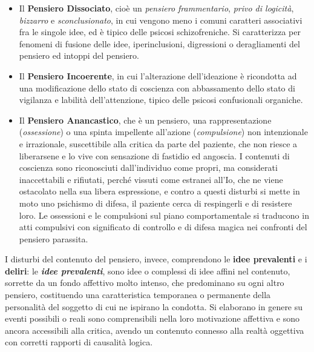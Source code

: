 \documentclass[]{article}
\begin{document}
\begin{itemize}
\item
  Il \textbf{Pensiero Dissociato}, cioè un \emph{pensiero frammentario},
  \emph{privo di logicità}, \emph{bizzarro} e \emph{sconclusionato}, in
  cui vengono meno i comuni caratteri associativi fra le singole idee,
  ed è tipico delle psicosi schizofreniche. Si caratterizza per fenomeni
  di fusione delle idee, iperinclusioni, digressioni o deragliamenti del
  pensiero ed intoppi del pensiero.
\item
  Il \textbf{Pensiero Incoerente}, in cui l'alterazione dell'ideazione è
  ricondotta ad una modificazione dello stato di coscienza con
  abbassamento dello stato di vigilanza e labilità dell'attenzione,
  tipico delle psicosi confusionali organiche.
\item
  Il \textbf{Pensiero Anancastico}, che è un pensiero, una
  rappresentazione (\emph{ossessione}) o una spinta impellente
  all'azione (\emph{compulsione}) non intenzionale e irrazionale,
  suscettibile alla critica da parte del paziente, che non riesce a
  liberarsene e lo vive con sensazione di fastidio ed angoscia. I
  contenuti di coscienza sono riconosciuti dall'individuo come propri,
  ma considerati inaccettabili e rifiutati, perché vissuti come estranei
  all'Io, che ne viene ostacolato nella sua libera espressione, e contro
  a questi disturbi si mette in moto uno psichismo di difesa, il
  paziente cerca di respingerli e di resistere loro. Le ossessioni e le
  compulsioni sul piano comportamentale si traducono in atti compulsivi
  con significato di controllo e di difesa magica nei confronti del
  pensiero parassita.
\end{itemize}

I disturbi del contenuto del pensiero, invece, comprendono le
\textbf{idee prevalenti} e i \textbf{deliri}: le \textbf{\emph{idee
prevalenti}}, sono idee o complessi di idee affini nel contenuto,
sorrette da un fondo affettivo molto intenso, che predominano su ogni
altro pensiero, costituendo una caratteristica temporanea o permanente
della personalità del soggetto di cui ne ispirano la condotta. Si
elaborano in genere su eventi possibili o reali sono comprensibili nella
loro motivazione affettiva e sono ancora accessibili alla critica,
avendo un contenuto connesso alla realtà oggettiva con corretti rapporti
di causalità logica.
\end{document}
